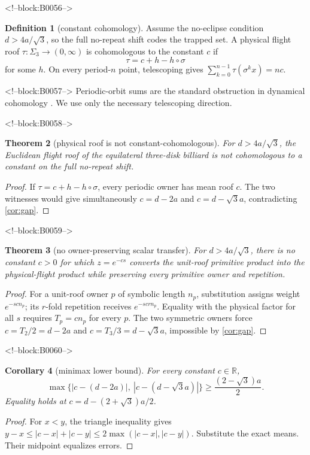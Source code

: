 \documentclass[11pt,a4paper]{article}
\newtheorem{theorem}{Theorem}[section]
\newtheorem{corollary}[theorem]{Corollary}
\theoremstyle{definition}
\newtheorem{definition}[theorem]{Definition}
\theoremstyle{remark}
\begin{document}
<!--block:B0056-->
\begin{definition}[constant cohomology]
Assume the no-eclipse condition \(d>4a/\sqrt3\), so the full no-repeat shift
codes the trapped set.  A physical flight roof
\(\tau:\Sigma_3\to(0,\infty)\) is cohomologous to the constant \(c\) if
\[
 \tau=c+h-h\circ\sigma
\]
for some \(h\). On every period-\(n\) point, telescoping gives
\(\sum_{k=0}^{n-1}\tau(\sigma^kx)=nc\).
\end{definition}

<!--block:B0057-->
Periodic-orbit sums are the standard obstruction in dynamical cohomology \citep[main cohomology criteria]{Livsic1972}. We use only the necessary telescoping direction.

<!--block:B0058-->
\begin{theorem}[physical roof is not constant-cohomologous]\label{thm:noncohom}
For \(d>4a/\sqrt3\), the Euclidean flight roof of the equilateral three-disk
billiard is not cohomologous to a constant on the full no-repeat shift.
\end{theorem}
\begin{proof}
If \(\tau=c+h-h\circ\sigma\), every periodic owner has mean roof \(c\). The two witnesses would give simultaneously \(c=d-2a\) and \(c=d-\sqrt3a\), contradicting \cref{cor:gap}.
\end{proof}

<!--block:B0059-->
\begin{theorem}[no owner-preserving scalar transfer]\label{thm:nontransfer}
For \(d>4a/\sqrt3\), there is no constant \(c>0\) for which \(z=e^{-cs}\)
converts the unit-roof primitive product into the physical-flight product
while preserving every primitive owner and repetition.
\end{theorem}
\begin{proof}
For a unit-roof owner \(p\) of symbolic length \(n_p\), substitution assigns weight \(e^{-scn_p}\); its \(r\)-fold repetition receives \(e^{-scrn_p}\). Equality with the physical factor for all \(s\) requires \(T_p=cn_p\) for every \(p\). The two symmetric owners force \(c=T_2/2=d-2a\) and \(c=T_3/3=d-\sqrt3a\), impossible by \cref{cor:gap}.
\end{proof}

<!--block:B0060-->
\begin{corollary}[minimax lower bound]\label{cor:minimax}
For every constant \(c\in\mathbb R\),
\[
 \max\{|c-(d-2a)|,\ |c-(d-\sqrt3a)|\}
 \ge \frac{(2-\sqrt3)a}{2}.
\]
Equality holds at \(c=d-(2+\sqrt3)a/2\).
\end{corollary}
\begin{proof}
For \(x<y\), the triangle inequality gives
\(y-x\le|c-x|+|c-y|\le2\max(|c-x|,|c-y|)\). Substitute the exact means. Their midpoint equalizes errors.
\end{proof}
\end{document}

